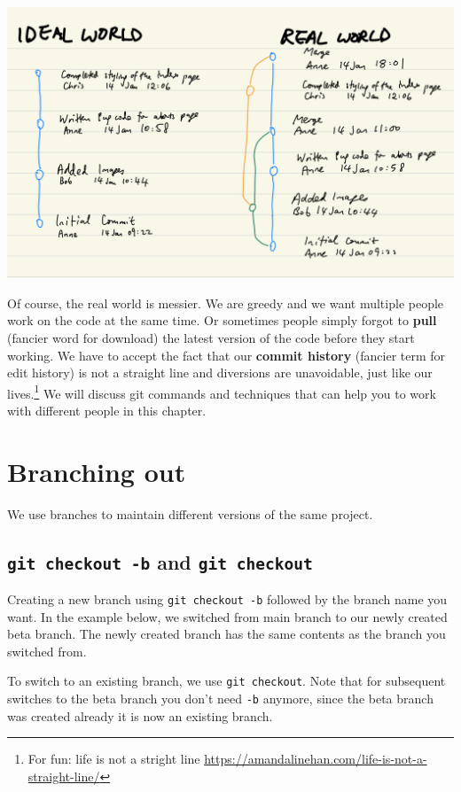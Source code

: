 \includegraphics[width=15cm]{images/ch8-messy-git-world.png}

Of course, the real world is messier. We are greedy and we want multiple people work on the code at the same time. Or sometimes people simply forgot to \textbf{pull} (fancier word for download) the latest version of the code before they start working. We have to accept the fact that our \textbf{commit history} (fancier term for edit history) is not a straight line and diversions are unavoidable, just like our lives.\footnote{For fun: life is not a stright line \url{https://amandalinehan.com/life-is-not-a-straight-line/}} We will discuss git commands and techniques that can help you to work with different people in this chapter.

\section{Branching out}

We use branches to maintain different versions of the same project. 

\subsection*{\texttt{git checkout -b} and \texttt{git checkout}}

Creating a new branch using \texttt{git checkout -b} followed by the branch name you want. In the example below, we switched from main branch to our newly created beta branch. The newly created branch has the same contents as the branch you switched from.

To switch to an existing branch, we use \texttt{git checkout}. Note that for subsequent switches to the beta branch you don't need \texttt{-b} anymore, since the beta branch was created already it is now an existing branch.

